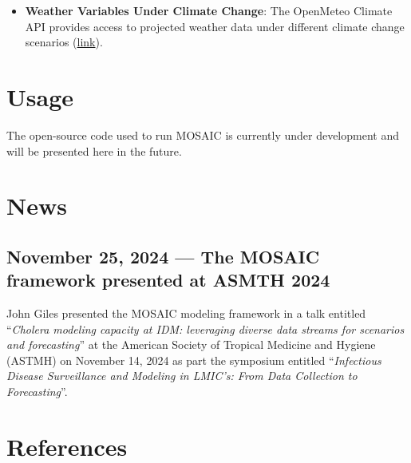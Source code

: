 \documentclass[
]{book}
\providecommand{\tightlist}{%
  \setlength{\itemsep}{0pt}\setlength{\parskip}{0pt}}
\begin{document}
\begin{itemize}
\tightlist
\item
  \textbf{Weather Variables Under Climate Change}: The OpenMeteo Climate API provides access to projected weather data under different climate change scenarios (\href{https://open-meteo.com/en/docs/climate-api}{link}).
\end{itemize}

\chapter{Usage}\label{usage}

The open-source code used to run MOSAIC is currently under development and will be presented here in the future.

\chapter{News}\label{news}

\section*{November 25, 2024 --- The MOSAIC framework presented at ASMTH 2024}\label{november-25-2024-the-mosaic-framework-presented-at-asmth-2024}

John Giles presented the MOSAIC modeling framework in a talk entitled ``\emph{Cholera modeling capacity at IDM:
leveraging diverse data streams for scenarios and forecasting}'' at the American Society of Tropical Medicine and Hygiene (ASTMH) on November 14, 2024 as part the symposium entitled ``\emph{Infectious Disease Surveillance and Modeling in LMIC's: From Data Collection to Forecasting}''.

\chapter{References}\label{references}

  
\end{document}
